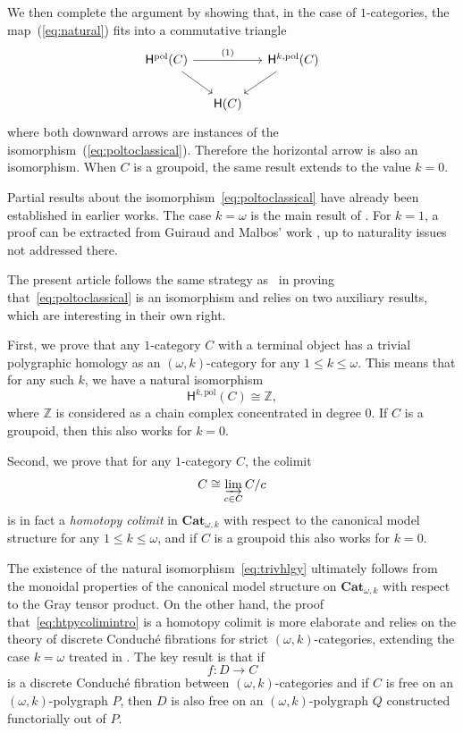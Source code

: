 \documentclass[reqno]{amsart}
\theoremstyle{plain}
\theoremstyle{definition}
\theoremstyle{remark}
\newcommand{\nmbr}[1]{\mathbb #1}
\newcommand{\Z}{\nmbr{Z}}
\newcommand{\pair}[2]{(#1,#2)}       %
\newcommand{\ilim}{\varinjlim} %
\newcommand{\tr}[2]{#1/#2} %
\newcommand{\ctg}[1]{\mathbf{#1}}  %
\newcommand{\Cat}{\ctg{Cat}}   %
\newcommand{\opCat}[1]{\Cat_{\omega,#1}} %
\newcommand{\functor}[1]{\mathsf{#1}} %
\newcommand{\oo}{\ensuremath{\omega}}
\newcommand{\ook}[1]{\ensuremath{\pair{\omega}{#1}}}
\newcommand{\Ho}{\functor{H}} %
\newcommand{\Hop}[1]{\Ho^{#1,\mathrm{pol}}} %
\newcommand{\Hopol}{\Ho^{\mathrm{pol}}}%
\begin{document}
  We then complete the argument by showing that, in the case of
  $1$-categories, the map~(\ref{eq:natural}) fits into a commutative triangle
 \[
    \begin{tikzcd}[column sep=small]
      \Hopol(C) \ar[dr]\ar[rr,"(1)"]&&\Hop k (C)\ar[dl]\\
      &\Ho(C)&
    \end{tikzcd}
  \]
  where both downward arrows are instances of the
  isomorphism~(\ref{eq:poltoclassical}). Therefore the horizontal
  arrow is also an isomorphism. When $C$ is a groupoid, the same
  result extends to the value $k=0$.

  Partial results about the isomorphism~\eqref{eq:poltoclassical} have
already been established in earlier works. The case $k=\oo$ is the main result of
\cite{guetta:homcat}. For $k=1$, a proof can be
extracted from Guiraud and Malbos' work \cite[Theorem
5.4.3]{guiraudmalbos:higdns}, up to naturality issues not addressed there.

The present article follows the same strategy as~\cite{guetta:homcat}
in proving that~\eqref{eq:poltoclassical} is an isomorphism and relies on two
 auxiliary results, which are interesting in their own right.

 First, we prove that any $1$-category $C$ with a terminal object has a
 trivial polygraphic homology as an \ook k-category for any $1 \leq k
 \leq \oo$. This means that for any such $k$, we have a natural isomorphism
   \begin{equation}\label{eq:trivhlgy}
      \Hop k (C) \cong \Z,
    \end{equation}
    where $\Z$ is considered as a chain complex concentrated in degree
    $0$. If $C$ is a groupoid, then this also works for $k=0$.

    Second, we prove that for any $1$-category $C$, the colimit
    \begin{equation}\label{eq:htpycolimintro}
      C \cong \ilim_{c \in C} \tr{C}{c}
    \end{equation}
    is in fact a \emph{homotopy colimit} in $\opCat{k}$ with respect to the
    canonical model structure for any $1 \leq k \leq \oo$, and if $C$ is a
    groupoid this also works for $k=0$. 

The existence of the natural
isomorphism~\eqref{eq:trivhlgy} ultimately follows from
the monoidal properties of the canonical model structure on $\opCat{k}$
with respect to the Gray tensor product. On the other hand, the proof
that~\eqref{eq:htpycolimintro} is a homotopy colimit is more elaborate and
relies on the theory of discrete Conduché fibrations for strict \ook k-categories, extending the case $k=\oo$ treated in
\cite{guetta:poldcf}. The key result is that if \[f \colon D
\to C\] is a discrete Conduché fibration between \ook k-categories and
if $C$ is free on an \ook k-polygraph $P$, then $D$ is also free on an
\ook k-polygraph $Q$ constructed functorially out of $P$. 
\end{document}
